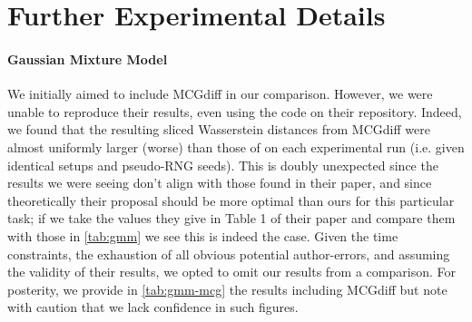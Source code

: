 \newpage

\section{Further Experimental Details} \label{sec:experimental-extra}

\paragraph{Gaussian Mixture Model} We initially aimed to include MCGdiff
\parencite{cardosoMonteCarloGuided2023} in our comparison. However, we were unable to reproduce
their results, even using the code on their repository. Indeed, we found that the resulting sliced
Wasserstein distances from MCGdiff were almost uniformly larger (worse) than those of
 on each experimental run (i.e. given identical setups and pseudo-RNG seeds). This
is doubly unexpected since the results we were seeing don't align with those found in their paper,
and since theoretically their proposal should be more optimal than ours for this particular task;
if we take the values they give in Table 1 of their paper and compare them with those in
\autoref{tab:gmm} we see this is indeed the case. Given the time constraints, the exhaustion of all
obvious potential author-errors, and assuming the validity of their results, we opted to omit our
results from a comparison. For posterity, we provide in \autoref{tab:gmm-mcg} the results including
MCGdiff but note with caution that we lack confidence in such figures.


